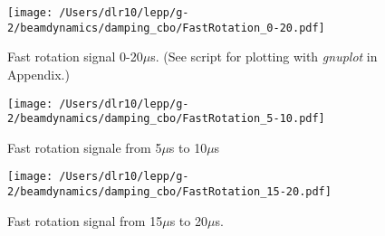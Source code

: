 \documentclass[10pt]{article}
\begin{document}
\begin{figure}[htbp] %
   \centering
   \texttt{[image: /Users/dlr10/lepp/g-2/beamdynamics/damping\_cbo/FastRotation\_0-20.pdf]} 
   \caption{Fast rotation signal 0-20$\mu$s. (See script for plotting with {\it gnuplot} in Appendix.) \label{fig:fastrotation_0-20}}
\end{figure}
\begin{figure}[htbp] %
\begin{minipage}[t]{0.48\textwidth}
   \centering
   \texttt{[image: /Users/dlr10/lepp/g-2/beamdynamics/damping\_cbo/FastRotation\_5-10.pdf]} 
   \caption{Fast rotation signale from 5$\mu$s to 10$\mu$s \label{fig:fastrotation_5-10}}
 \end{minipage}
\hfill
\begin{minipage}[t]{0.48\textwidth}
\centering
   \texttt{[image: /Users/dlr10/lepp/g-2/beamdynamics/damping\_cbo/FastRotation\_15-20.pdf]} 
\caption{Fast rotation signal from 15$\mu$s to 20$\mu$s.
   \label{fig:fastrotation_15-20}}
\end{minipage}
\end{figure}
\end{document}
